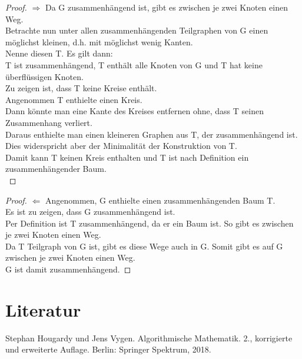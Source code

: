 \documentclass{beamer}
\begin{document}
        \begin{frame}
        \begin{center}
        \begin{proof}
       $\Rightarrow$ Da G zusammenhängend ist, gibt es zwischen je zwei Knoten einen Weg.\\
         Betrachte nun unter allen zusammenhängenden Teilgraphen von G einen möglichst kleinen, d.h. mit möglichst wenig Kanten.\\
          Nenne diesen T. Es gilt dann:\\
          T ist zusammenhängend, T enthält alle Knoten von G und T hat keine überflüssigen Knoten.\\
          Zu zeigen ist, dass T keine Kreise enthält.\\
          Angenommen T enthielte einen Kreis.\\
          Dann könnte man eine Kante des Kreises entfernen ohne, dass T seinen Zusammenhang verliert.\\
          Daraus enthielte man einen kleineren Graphen aus T, der zusammenhängend ist. Dies widerspricht aber der Minimalität der Konstruktion von T.\\
          Damit kann T keinen Kreis enthalten und T ist nach Definition ein zusammenhängender Baum.\\
          \end{proof}
          \end{center}
    \vfill
    \end{frame}

    \begin{frame}
    \begin{center}
        \begin{proof}
        $\Leftarrow$ Angenommen, G enthielte einen zusammenhängenden Baum T.\\
          Es ist zu zeigen, dass G zusammenhängend ist.\\
         Per Definition ist T zusammenhängend, da er ein Baum ist. So gibt es zwischen je zwei Knoten einen Weg.\\
         Da T Teilgraph von G ist, gibt es diese Wege auch in G. Somit gibt es auf G zwischen je zwei Knoten einen Weg.\\
         G ist damit zusammenhängend.
         \end{proof}
        \end{center}
    \vfill
    \end{frame}


\section{Literatur}

  \begin{frame}
  \vfill
    \begin{center}
     Stephan Hougardy und Jens Vygen. Algorithmische Mathematik. 2., korrigierte und erweiterte Auflage. Berlin: Springer Spektrum, 2018.
    \end{center}
  \vfill
  \end{frame}
\end{document}
